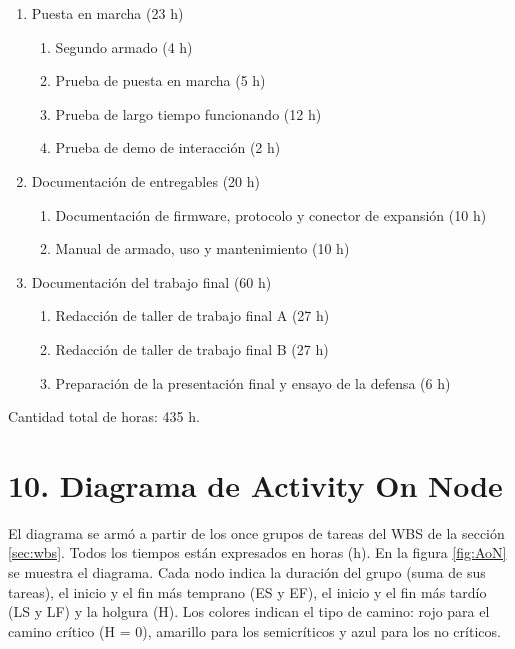 \documentclass[
11pt, %
]{charter}
\begin{document}
\begin{enumerate}
\begin{enumerate}
		\item Prueba del juego de interacción con objetos (3 h)
		\item Plan de pruebas de verificación de requerimientos (5 h)
		\item Medición del tiempo de detección y giro de cabeza (3 h)
		\item Verificación de seguridad física y del tiempo de armado (3 h)
	\end{enumerate}
\item Puesta en marcha (23 h)
	\begin{enumerate}
		\item Segundo armado (4 h)
		\item Prueba de puesta en marcha (5 h)
		\item Prueba de largo tiempo funcionando (12 h)
		\item Prueba de demo de interacción (2 h)
	\end{enumerate}
\item Documentación de entregables (20 h)
	\begin{enumerate}
		\item Documentación de firmware, protocolo y conector de expansión (10 h)
		\item Manual de armado, uso y mantenimiento (10 h)
	\end{enumerate}
\item Documentación del trabajo final (60 h)
	\begin{enumerate}
		\item Redacción de taller de trabajo final A (27 h)
		\item Redacción de taller de trabajo final B (27 h)
		\item Preparación de la presentación final y ensayo de la defensa (6 h)
	\end{enumerate}
\end{enumerate}

Cantidad total de horas: 435 h.


\section{10. Diagrama de Activity On Node}
\label{sec:AoN}

El diagrama se armó a partir de los once grupos de tareas del WBS de la sección \ref{sec:wbs}. Todos los tiempos están expresados en horas (h). En la figura \ref{fig:AoN} se muestra el diagrama. Cada nodo indica la duración del grupo (suma de sus tareas), el inicio y el fin más temprano (ES y EF), el inicio y el fin más tardío (LS y LF) y la holgura (H). Los colores indican el tipo de camino: rojo para el camino crítico (H = 0), amarillo para los semicríticos y azul para los no críticos.
\end{document}
